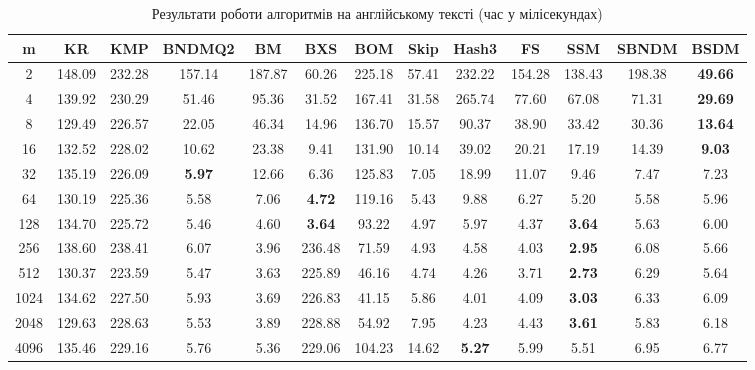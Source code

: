 \documentclass[a4paper,14pt]{extarticle} %
\begin{document}
	\begin{table}[h]
		\centering
		\scriptsize
		\begin{tabular}{|c|c|c|c|c|c|c|c|c|c|c|c|c|}
		\hline
		\textbf{m} & \textbf{KR} & \textbf{KMP} & \textbf{BNDMQ2} & \textbf{BM} & \textbf{BXS} & \textbf{BOM} & \textbf{Skip} & \textbf{Hash3} & \textbf{FS} & \textbf{SSM} & \textbf{SBNDM} & \textbf{BSDM} \\
		\hline
		2 & 148.09 & 232.28 & 157.14 & 187.87 & 60.26 & 225.18 & 57.41 & 232.22 & 154.28 & 138.43 & 198.38 & \textbf{49.66} \\
		\hline
		4 & 139.92 & 230.29 & 51.46 & 95.36 & 31.52 & 167.41 & 31.58 & 265.74 & 77.60 & 67.08 & 71.31 & \textbf{29.69} \\
		\hline
		8 & 129.49 & 226.57 & 22.05 & 46.34 & 14.96 & 136.70 & 15.57 & 90.37 & 38.90 & 33.42 & 30.36 & \textbf{13.64} \\
		\hline
		16 & 132.52 & 228.02 & 10.62 & 23.38 & 9.41 & 131.90 & 10.14 & 39.02 & 20.21 & 17.19 & 14.39 & \textbf{9.03} \\
		\hline
		32 & 135.19 & 226.09 & \textbf{5.97} & 12.66 & 6.36 & 125.83 & 7.05 & 18.99 & 11.07 & 9.46 & 7.47 & 7.23 \\
		\hline
		64 & 130.19 & 225.36 & 5.58 & 7.06 & \textbf{4.72} & 119.16 & 5.43 & 9.88 & 6.27 & 5.20 & 5.58 & 5.96 \\
		\hline
		128 & 134.70 & 225.72 & 5.46 & 4.60 & \textbf{3.64} & 93.22 & 4.97 & 5.97 & 4.37 & \textbf{3.64} & 5.63 & 6.00 \\
		\hline
		256 & 138.60 & 238.41 & 6.07 & 3.96 & 236.48 & 71.59 & 4.93 & 4.58 & 4.03 & \textbf{2.95} & 6.08 & 5.66 \\
		\hline
		512 & 130.37 & 223.59 & 5.47 & 3.63 & 225.89 & 46.16 & 4.74 & 4.26 & 3.71 & \textbf{2.73} & 6.29 & 5.64 \\
		\hline
		1024 & 134.62 & 227.50 & 5.93 & 3.69 & 226.83 & 41.15 & 5.86 & 4.01 & 4.09 & \textbf{3.03} & 6.33 & 6.09 \\
		\hline
		2048 & 129.63 & 228.63 & 5.53 & 3.89 & 228.88 & 54.92 & 7.95 & 4.23 & 4.43 & \textbf{3.61} & 5.83 & 6.18 \\
		\hline
		4096 & 135.46 & 229.16 & 5.76 & 5.36 & 229.06 & 104.23 & 14.62 & \textbf{5.27} & 5.99 & 5.51 & 6.95 & 6.77 \\
		\hline
		\end{tabular}
		\caption{Результати роботи алгоритмів на англійському тексті (час у мілісекундах)}
		\label{table:lotr}
		\end{table}
\end{document}
